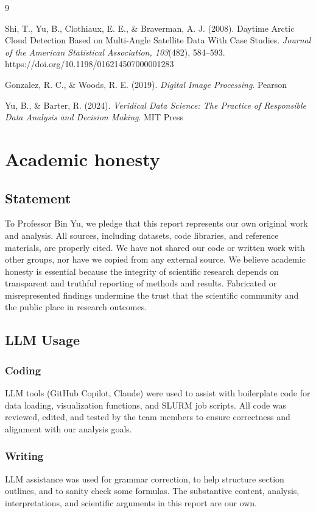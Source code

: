 \documentclass[11pt,letterpaper]{article}
\begin{document}
\begin{thebibliography}{9}

Shi, T., Yu, B., Clothiaux, E. E., \& Braverman, A. J. (2008). Daytime Arctic Cloud Detection Based on Multi-Angle Satellite Data With Case Studies. \textit{Journal of the American Statistical Association, 103}(482), 584–593. https://doi.org/10.1198/016214507000001283

Gonzalez, R. C., \& Woods, R. E. (2019). \textit{Digital Image Processing}. Pearson

Yu, B., \& Barter, R. (2024). \textit{Veridical Data Science: The Practice of Responsible Data Analysis and Decision Making}. MIT Press

\end{thebibliography}

\appendix
\section{Academic honesty}

\subsection{Statement}

To Professor Bin Yu, we pledge that this report represents our own original work and analysis. All sources, including datasets, code libraries, and reference materials, are properly cited. We have not shared our code or written work with other groups, nor have we copied from any external source. We believe academic honesty is essential because the integrity of scientific research depends on transparent and truthful reporting of methods and results. Fabricated or misrepresented findings undermine the trust that the scientific community and the public place in research outcomes.

\subsection{LLM Usage}

\subsubsection*{Coding}
LLM tools (GitHub Copilot, Claude) were used to assist with boilerplate code for data loading, visualization functions, and SLURM job scripts. All code was reviewed, edited, and tested by the team members to ensure correctness and alignment with our analysis goals.

\subsubsection*{Writing}
LLM assistance was used for grammar correction, to help structure section outlines, and to sanity check some formulas. The substantive content, analysis, interpretations, and scientific arguments in this report are our own.
\end{document}
